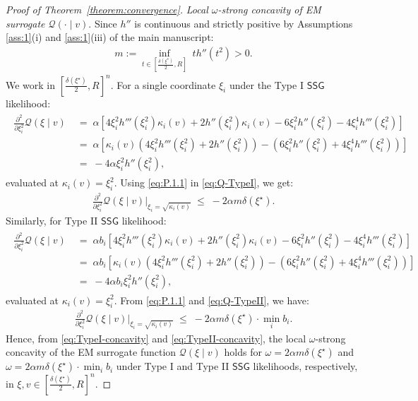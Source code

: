 \documentclass[12pt]{article}
\numberwithin{equation}{section}
\begin{document}
\begin{proof}[Proof of Theorem~\ref{theorem:convergence}]
\noindent
\emph{Local $\omega$-strong concavity of EM surrogate $\mathcal{Q}(\cdot \mid v)$}. Since $h''$ is continuous and strictly positive by Assumptions \ref{ass:1}(i) and \ref{ass:1}(iii) of the main manuscript:
\begin{align}\label{eq:P.1.1}
m := \inf_{t\in \left[\tfrac{\delta(\xi^{\star})}{2}, R\right]}\;th''(t^2) > 0.
\end{align}
We work in $\left[\tfrac{\delta(\xi^{\star})}{2}, R\right]^{n}$. For a single coordinate $\xi_i$ under the Type I $\mathsf{SSG}$ likelihood:
\begin{align}\label{eq:Q-TypeI}
\begin{split}
    \frac{\partial^2}{\partial \xi_i^2}\mathcal{Q}(\xi\mid v)\; &= \; \alpha \left[4\xi^2_ih'''(\xi_i^2)\kappa_i(v) + 2h''(\xi_i^2)\kappa_i(v) - 6\xi_i^2h''(\xi_i^2) - 4\xi_i^4h'''(\xi_i^2)\right]\\
    &=\; \alpha \left[\kappa_i(v)\left(4\xi_i^2h'''(\xi_i^2) + 2h''(\xi_i^2)\right) - \left(6\xi_i^2h''(\xi_i^2) + 4\xi_i^4 h'''(\xi_i^2)\right)\right]\\
    &=\; -4\alpha \xi_i^2h''(\xi_i^2),
\end{split}
\end{align}
evaluated at $\kappa_i(v) = \xi_i^2$. Using \eqref{eq:P.1.1} in \eqref{eq:Q-TypeI}, we get:
\begin{align}\label{eq:TypeI-concavity}
    \frac{\partial^2}{\partial \xi_i^2}\mathcal{Q}(\xi\mid v)\Big|_{\xi_i = \sqrt{\kappa_i(v)}}\;\leq\; -2\alpha m\delta(\xi^{\star}).
\end{align}
Similarly, for Type II $\mathsf{SSG}$ likelihood:
\begin{align}\label{eq:Q-TypeII}
\begin{split}
    \frac{\partial^2}{\partial \xi_i^2}\mathcal{Q}(\xi\mid v)\; &= \; \alpha b_i \left[4\xi^2_ih'''(\xi_i^2)\kappa_i(v) + 2h''(\xi_i^2)\kappa_i(v) - 6\xi_i^2h''(\xi_i^2) - 4\xi_i^4h'''(\xi_i^2)\right]\\
    &=\; \alpha b_i \left[\kappa_i(v)\left(4\xi_i^2h'''(\xi_i^2) + 2h''(\xi_i^2)\right) - \left(6\xi_i^2h''(\xi_i^2) + 4\xi_i^4 h'''(\xi_i^2)\right)\right]\\
    &=\; -4\alpha b_i \xi_i^2h''(\xi_i^2),
\end{split}
\end{align}
evaluated at $\kappa_i(v) = \xi_i^2$.  From \eqref{eq:P.1.1} and \eqref{eq:Q-TypeII}, we have:
\begin{align}\label{eq:TypeII-concavity}
\frac{\partial^2}{\partial \xi_i^2}\mathcal{Q}(\xi\mid v)\Big|_{\xi_i = \sqrt{\kappa_i(v)}}\;\leq\; -2\alpha m\delta(\xi^{\star})\cdot \min_{i}b_i.
\end{align}
Hence, from \eqref{eq:TypeI-concavity} and \eqref{eq:TypeII-concavity}, the local $\omega$-strong concavity of the EM surrogate function $\mathcal{Q}(\xi \mid v)$ holds for $\omega = 2\alpha m \delta(\xi^{\star})$ and $\omega = 2\alpha m \delta(\xi^{\star}) \cdot \min_i b_i$ under Type I and Type II $\mathsf{SSG}$ likelihoods, respectively, in $\xi, v \in \left[\tfrac{\delta(\xi^{\star})}{2}, R\right]^{n}$.


\end{proof}
\end{document}
